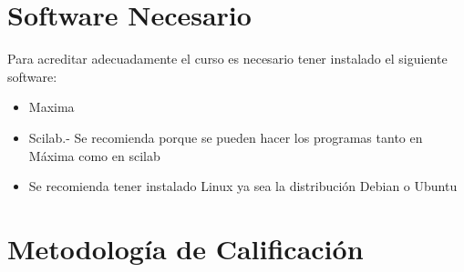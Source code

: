 \documentclass[12pt]{book}
\theoremstyle{definition}
\theoremstyle{remark}
\theoremstyle{plain}
\begin{document}
\section{Software Necesario}

Para acreditar adecuadamente el curso es necesario tener instalado el siguiente software:
\begin{itemize}
 \item Maxima
 \item Scilab.- Se recomienda porque se pueden hacer los programas tanto en Máxima como en scilab
 \item Se recomienda tener instalado Linux ya sea la distribución Debian o Ubuntu
\end{itemize}

\section{Metodología de Calificación}
\end{document}
